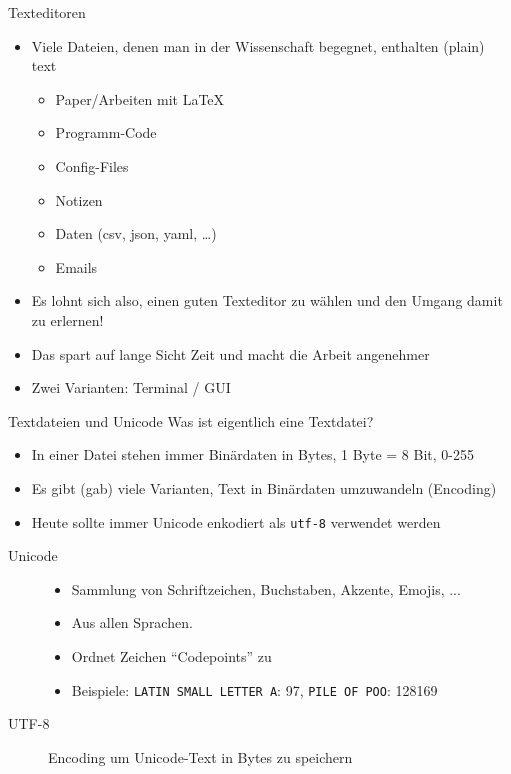 \begin{frame}{Texteditoren}
  \begin{itemize}
    \item Viele Dateien, denen man in der Wissenschaft begegnet, enthalten (plain) text
      \begin{itemize}
        \item Paper/Arbeiten mit \LaTeX
        \item Programm-Code
        \item Config-Files
        \item Notizen
        \item Daten (csv, json, yaml, …)
        \item Emails
      \end{itemize}
    \item Es lohnt sich also, einen guten Texteditor zu wählen und den Umgang damit zu erlernen!
    \item Das spart auf lange Sicht Zeit und macht die Arbeit angenehmer
    \item Zwei Varianten: Terminal / GUI
  \end{itemize}
\end{frame}

\begin{frame}[c]{Textdateien und Unicode}
  Was ist eigentlich eine Textdatei?

  \begin{itemize}
    \item In einer Datei stehen immer Binärdaten in Bytes, 1 Byte = 8 Bit, 0-255
    \item Es gibt (gab) viele Varianten, Text in Binärdaten umzuwandeln (Encoding)
    \item Heute sollte immer Unicode enkodiert als \texttt{utf-8} verwendet werden
  \end{itemize}

  \begin{description}
    \item[Unicode]
      \begin{itemize}
        \item Sammlung von Schriftzeichen, Buchstaben, Akzente, Emojis, ...
        \item Aus allen Sprachen.
        \item Ordnet Zeichen \enquote{Codepoints} zu
        \item Beispiele: \texttt{LATIN SMALL LETTER A}: 97, \texttt{PILE OF POO}: 128169
      \end{itemize}
    \item[UTF-8] Encoding um Unicode-Text in Bytes zu speichern
  \end{description}

\end{frame}


